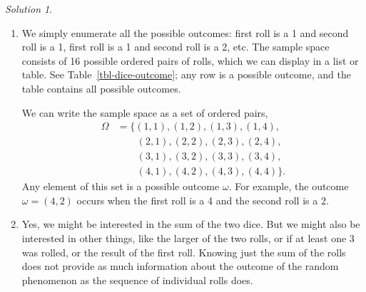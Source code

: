 \documentclass[
  letterpaper,
  DIV=11,
  numbers=noendperiod]{scrreprt}
\theoremstyle{plain}
\theoremstyle{definition}
\theoremstyle{definition}
\theoremstyle{definition}
\theoremstyle{remark}
\newtheorem{refsolution}{Solution}[chapter]
\begin{document}
\begin{tcolorbox}[enhanced jigsaw, opacityback=0, rightrule=.15mm, coltitle=black, colframe=quarto-callout-tip-color-frame, toprule=.15mm, colbacktitle=quarto-callout-tip-color!10!white, opacitybacktitle=0.6, left=2mm, toptitle=1mm, breakable, title={Solution (click to expand)}, bottomtitle=1mm, colback=white, leftrule=.75mm, titlerule=0mm, arc=.35mm, bottomrule=.15mm]

\begin{refsolution}
\leavevmode

\begin{enumerate}
\def\labelenumi{\arabic{enumi}.}
\item
  We simply enumerate all the possible outcomes: first roll is a 1 and
  second roll is a 1, first roll is a 1 and second roll is a 2, etc. The
  sample space consists of 16 possible ordered pairs of rolls, which we
  can display in a list or table. See Table~\ref{tbl-dice-outcome}; any
  row is a possible outcome, and the table contains all possible
  outcomes.

  We can write the sample space as a set of ordered pairs,
  \begin{align*}
  \Omega & = \{(1, 1), (1, 2), (1, 3), (1, 4),\\
  & \qquad (2, 1), (2, 2), (2, 3), (2, 4),\\
  & \qquad (3, 1), (3, 2), (3, 3), (3, 4),\\
  & \qquad (4, 1), (4, 2), (4, 3), (4, 4)\}.
  \end{align*} Any element of this set is a possible outcome \(\omega\).
  For example, the outcome \(\omega = (4, 2)\) occurs when the first
  roll is a 4 and the second roll is a 2.
\item
  Yes, we might be interested in the sum of the two dice. But we might
  also be interested in other things, like the larger of the two rolls,
  or if at least one 3 was rolled, or the result of the first roll.
  Knowing just the sum of the rolls does not provide as much information
  about the outcome of the random phenomenon as the sequence of
  individual rolls does.
\end{enumerate}

\label{sol-dice-outcome}

\end{refsolution}

\end{tcolorbox}
\end{document}
